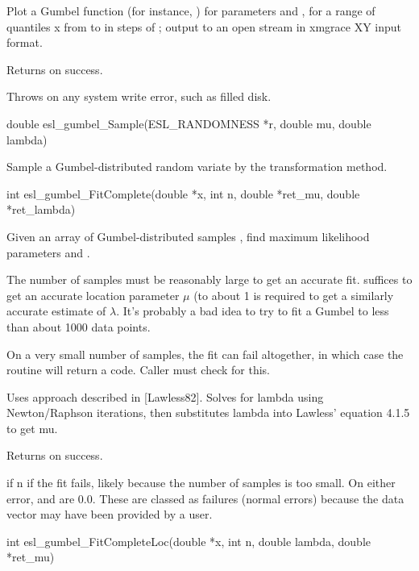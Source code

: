 \begin{sreapi}
Plot a Gumbel function  (for instance,
) for parameters  and , for
a range of quantiles x from  to  in steps of ;
output to an open stream  in xmgrace XY input format.

Returns  on success.

Throws  on any system write error, such as filled disk.


\hypertarget{func:esl_gumbel_Sample()}
{\item[double esl\_gumbel\_Sample(ESL\_RANDOMNESS *r, double mu, double lambda)]}

Sample a Gumbel-distributed random variate
by the transformation method.


\hypertarget{func:esl_gumbel_FitComplete()}
{\item[int esl\_gumbel\_FitComplete(double *x, int n, double *ret\_mu, double *ret\_lambda)]}

Given an array of Gumbel-distributed samples
, find maximum likelihood parameters 
and .

The number of samples  must be reasonably large to get
an accurate fit.  suffices to get an accurate
location parameter $\mu$ (to about 1%
 is required to get a similarly accurate
estimate of $\lambda$. It's probably a bad idea to try to
fit a Gumbel to less than about 1000 data points.

On a very small number of samples, the fit can fail
altogether, in which case the routine will return a
 code. Caller must check for this.

Uses approach described in [Lawless82]. Solves for lambda
using Newton/Raphson iterations, then substitutes lambda
into Lawless' equation 4.1.5 to get mu.

Returns  on success.

 if n if the fit fails, likely because the
number of samples is too small. On either error,
 and  are 0.0.  These are classed
as failures (normal errors) because the data vector may
have been provided by a user.


\hypertarget{func:esl_gumbel_FitCompleteLoc()}
{\item[int esl\_gumbel\_FitCompleteLoc(double *x, int n, double lambda, double *ret\_mu)]}


\end{sreapi}
